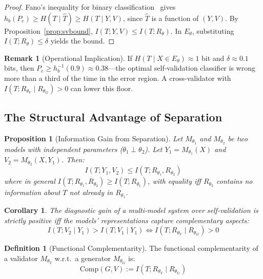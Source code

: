 \documentclass[11pt,a4paper]{article}
\newtheorem{proposition}{Proposition}[section]
\newtheorem{corollary}{Corollary}[section]
\theoremstyle{definition}
\newtheorem{definition}{Definition}[section]
\newtheorem{remark}{Remark}[section]
\newcommand{\Rtheta}{R_\theta}
\newcommand{\thetaG}{\theta_G}
\newcommand{\thetaV}{\theta_V}
\begin{document}
\begin{proof}
Fano's inequality for binary classification~\cite{cover2006elements} gives $h_b(P_e) \geq H(T \mid \hat{T}) \geq H(T \mid Y, V)$, since $\hat{T}$ is a function of $(Y,V)$. By Proposition~\ref{prop:svbound}, $I(T;Y,V) \leq I(T;\Rtheta)$. In $E_\theta$, substituting $I(T;\Rtheta) \leq \delta$ yields the bound.
\end{proof}

\begin{remark}[Operational Implication]
If $H(T \mid X \in E_\theta) \approx 1$ bit and $\delta \approx 0.1$ bits, then $P_e \geq h_b^{-1}(0.9) \approx 0.38$---the optimal self-validation classifier is wrong more than a third of the time in the error region. A cross-validator with $I(T; R_{\thetaV} \mid R_{\thetaG}) > 0$ can lower this floor.
\end{remark}


\subsection{The Structural Advantage of Separation}

\begin{proposition}[Information Gain from Separation]
\label{prop:infogain}
Let $M_{\theta_1}$ and $M_{\theta_2}$ be two models with independent parameters ($\theta_1 \perp \theta_2$). Let $Y_1 = M_{\theta_1}(X)$ and $V_2 = M_{\theta_2}(X, Y_1)$. Then:
\begin{equation}
I(T; Y_1, V_2) \leq I(T; R_{\theta_1}, R_{\theta_2})
\end{equation}
where in general $I(T; R_{\theta_1}, R_{\theta_2}) \geq I(T; R_{\theta_1})$, with equality iff $R_{\theta_2}$ contains no information about $T$ not already in $R_{\theta_1}$.
\end{proposition}

\begin{corollary}
\label{cor:compgain}
The diagnostic gain of a multi-model system over self-validation is strictly positive iff the models' representations capture complementary aspects:
\begin{equation}
I(T; V_2 \mid Y_1) > I(T; V_1 \mid Y_1) \iff I(T; R_{\thetaV} \mid R_{\thetaG}) > 0
\end{equation}
\end{corollary}

\begin{definition}[Functional Complementarity]
\label{def:comp}
The functional complementarity of a validator $M_{\thetaV}$ w.r.t.\ a generator $M_{\thetaG}$ is:
\begin{equation}
\mathrm{Comp}(G, V) := I(T; R_{\thetaV} \mid R_{\thetaG})
\end{equation}
\end{definition}
\end{document}
